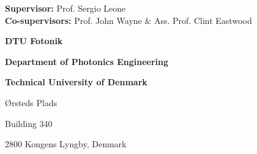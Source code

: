 \thispagestyle{empty} %
\frieze
\noindent
\sffamily

\large
\vspace*{\fill}
\hspace{-0.52cm}\textbf{Supervisor:} Prof. Sergio Leone\\
\textbf{Co-supervisors:} Prof. John Wayne \& Ass. Prof. Clint Eastwood
\vspace{5cm}

\small
\hspace*{\fill}\textbf{DTU Fotonik}

\hspace*{\fill}\textbf{Department of Photonics Engineering}

\hspace*{\fill}\textbf{Technical University of Denmark}

\hspace*{\fill}Ørsteds Plads

\hspace*{\fill}Building 340

\hspace*{\fill}2800 Kongens Lyngby, Denmark


\normalsize
\normalfont
\vspace*{2cm}
